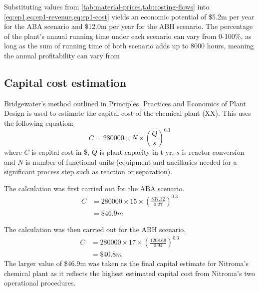 Substituting values from \cref{tab:material-prices,tab:costing-flows} into \cref{eq:ep1,eq:ep1-revenue,eq:ep1-cost} yields an economic potential of \$5.2m per year for the ABA scenario and \$12.0m per year for the ABH scenario. The percentage of the plant's annual running time under each scenario can vary from 0-100\%, as long as the sum of running time of both scenario adds up to 8000 hours, meaning the annual profitability can vary from 

\subsection{Capital cost estimation}

Bridgewater's method outlined in Principles, Practices and Economics of Plant Design is used to estimate the capital cost of the chemical plant (XX). This uses the following equation:
\begin{equation}
    C= \num{280000} \times N \times \left(\frac{Q}{s}\right)^{0.3}
\end{equation}
where $C$ is capital cost in \$, $Q$ is  plant capacity in t yr, $s$ is reactor conversion and $N$ is number of functional units (equipment and ancillaries needed for a significant process step such as reaction or separation).

The calculation was first carried out for the ABA scenario.
\begin{align*}
C &= \num{280000} \times 15 \times \left(\frac{837.32}{0.27}\right)^{0.3}  \\
  &= \$46.9m 
\end{align*}

The calculation was then carried out for the ABH scenario.
\begin{align*}
C &= 280000 \times 17 \times \left(\frac{1208.69}{0.94}\right)^{0.3}  \\
  &=\$40.8m 
\end{align*}
The larger value of \$46.9m was taken as the final capital estimate for Nitroma's chemical plant as it reflects the highest estimated capital cost from Nitroma's two operational procedures.